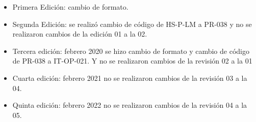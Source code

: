 \begin{itemize}
	\item Primera Edición: cambio de formato.
	\item Segunda Edición: se realizó cambio de código de HS-P-LM a PR-038 y no se realizaron cambios de la edición 01 a la 02.
	\item Tercera edición: febrero 2020 se hizo cambio de formato y cambio de código de PR-038 a IT-OP-021. Y no se realizaron cambios de la revisión 02 a la 01
	\item Cuarta edición: febrero 2021 no se realizaron cambios de la revisión 03 a la 04.
	\item Quinta edición: febrero 2022 no se realizaron cambios de la revisión 04 a la 05.
\end{itemize}
